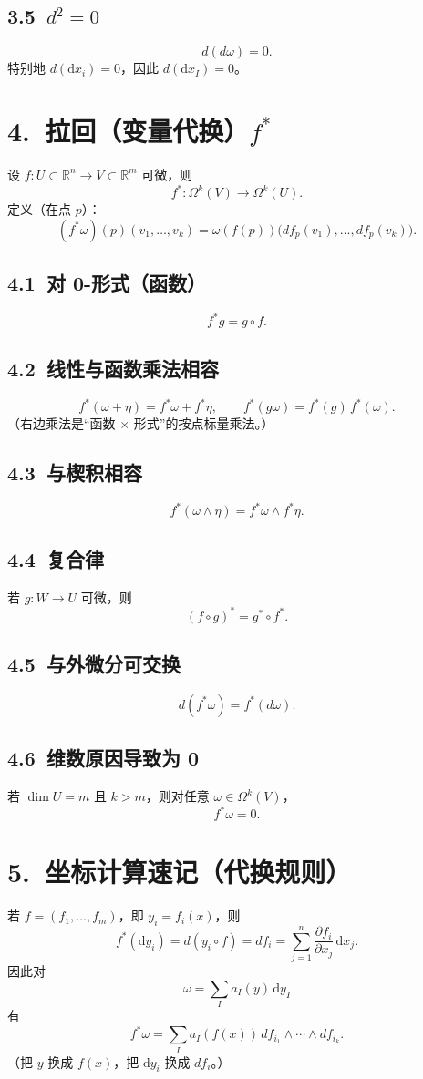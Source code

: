 \documentclass[11pt,a4paper]{article}
\newcommand{\R}{\mathbb{R}}
\newcommand{\Om}{\Omega}
\newcommand{\dx}{\mathrm{d}x}
\newcommand{\dy}{\mathrm{d}y}
\newcommand{\pull}{^{*}} %
\begin{document}
\subsection*{3.5\ $d^2=0$}
\[
d(d\omega)=0.
\]
特别地 $d(\dx_i)=0$，因此 $d(\dx_I)=0$。

\section*{4.\ 拉回（变量代换）$f\pull$}
设 $f:U\subset\R^n\to V\subset\R^m$ 可微，则
\[
f\pull:\Om^k(V)\to \Om^k(U).
\]
定义（在点 $p$）：
\[
(f\pull\omega)(p)(v_1,\dots,v_k)=\omega(f(p))\big(df_p(v_1),\dots,df_p(v_k)\big).
\]

\subsection*{4.1\ 对 0-形式（函数）}
\[
f\pull g=g\circ f.
\]

\subsection*{4.2\ 线性与函数乘法相容}
\[
f\pull(\omega+\eta)=f\pull\omega+f\pull\eta,\qquad
f\pull(g\omega)=f\pull(g)\,f\pull(\omega).
\]
（右边乘法是“函数 $\times$ 形式”的按点标量乘法。）

\subsection*{4.3\ 与楔积相容}
\[
f\pull(\omega\wedge\eta)=f\pull\omega\wedge f\pull\eta.
\]

\subsection*{4.4\ 复合律}
若 $g:W\to U$ 可微，则
\[
(f\circ g)\pull = g\pull\circ f\pull.
\]

\subsection*{4.5\ 与外微分可交换}
\[
d(f\pull\omega)=f\pull(d\omega).
\]

\subsection*{4.6\ 维数原因导致为 0}
若 $\dim U=m$ 且 $k>m$，则对任意 $\omega\in\Om^k(V)$，
\[
f\pull\omega=0.
\]

\section*{5.\ 坐标计算速记（代换规则）}
若 $f=(f_1,\dots,f_m)$，即 $y_i=f_i(x)$，则
\[
f\pull(\dy_i)=d(y_i\circ f)=df_i=\sum_{j=1}^n \frac{\partial f_i}{\partial x_j}\,\dx_j.
\]
因此对
\[
\omega=\sum_I a_I(y)\,\dy_I
\]
有
\[
f\pull\omega=\sum_I a_I(f(x))\, df_{i_1}\wedge\cdots\wedge df_{i_k}.
\]
（把 $y$ 换成 $f(x)$，把 $\dy_i$ 换成 $df_i$。）
\end{document}
